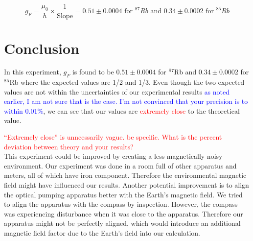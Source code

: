 \documentclass[prb,preprint]{revtex4-1}
\begin{document}
\begin{equation}
g_{F}=\frac{\mu_{0}}{h} \times \frac{1}{\textrm{Slope}}=0.51\pm0.0004 \textrm{ for } ^{87}Rb \textrm{ and } 0.34\pm0.0002 \textrm{ for } ^{85}Rb
\label{gf}
\end{equation}


\section{Conclusion}

In this experiment, $g_{F}$ is found to be $0.51\pm0.0004$ for $^8$$^7$Rb and $0.34\pm0.0002$ for $^8$$^5$Rb where the expected values are 1/2 and 1/3. Even though the two expected values are not within the uncertainties of our experimental results \textcolor{blue}{as noted earlier, I am not sure that is the case. I'm not convinced that your precision is to within 0.01\%}, we can see that our values are \textcolor{red}{extremely close} to the theoretical value.

\textcolor{red}{``Extremely close'' is unncessarily vague. be specific. What is the percent deviation between theory and your results?}\\

This experiment could be improved by creating a less magnetically noisy environment. Our experiment was done in a room full of other apparatus and meters, all of which have iron component. Therefore the environmental magnetic field might have influenced our results. Another potential improvement is to align the optical pumping apparatus better with the Earth's magnetic field. We tried to align the apparatus with the compass by inspection. However, the compass was experiencing disturbance when it was close to the apparatus. Therefore our apparatus might not be perfectly aligned, which would introduce an additional magnetic field factor due to the Earth's field into our calculation. \\




\end{document}
